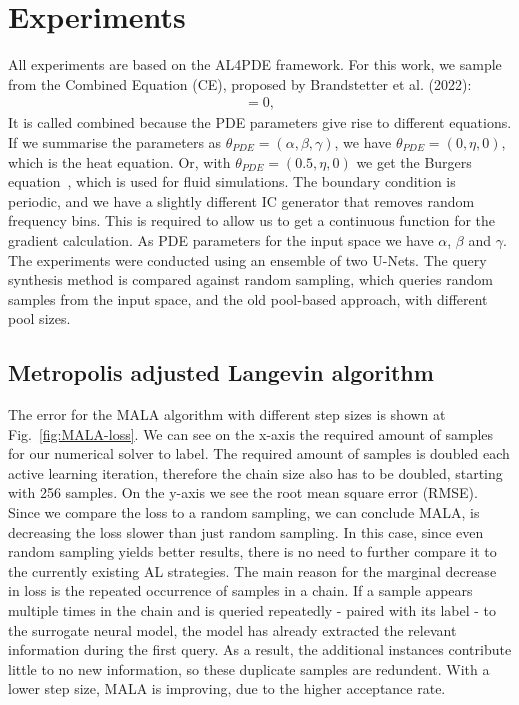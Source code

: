 \chapter{Experiments}
All experiments are based on the AL4PDE framework.
For this work, we sample from the Combined Equation (CE), proposed by Brandstetter et al. (2022):
\begin{align}
    [\partial_t u+\partial_x (\alpha u^2-\beta\partial_x u+\gamma\partial_{xx}u)]=0,
\end{align}
It is called combined because the PDE parameters give rise to different equations. 
If we summarise the parameters as $\theta_{PDE}=(\alpha,\beta,\gamma)$, we have $\theta_{PDE}=(0,\eta,0)$, which is the heat equation.
Or, with $\theta_{PDE}=(0.5,\eta,0)$ we get the Burgers equation~\cite{burgers}, which is used for fluid simulations.
The boundary condition is periodic, and we have a slightly different IC generator that removes random frequency bins. This is required 
to allow us to get a continuous function for the gradient calculation. As PDE parameters for the 
input space we have $\alpha$, $\beta$ and $\gamma$.    
The experiments were conducted using an ensemble of two U-Nets. 
The query synthesis method is compared against random sampling, which queries random samples from the input space, and the old pool-based approach, with different pool sizes. 
\section{Metropolis adjusted Langevin algorithm}
The error for the MALA algorithm with different step sizes is shown at Fig.~\ref{fig:MALA-loss}. 
We can see on the x-axis the required amount of samples 
for our numerical solver to label. The required amount of samples is doubled each active learning iteration, therefore 
the chain size also has to be doubled, starting with 256 samples.
On the y-axis we see the root mean square error (RMSE). 
Since we compare the loss to a random sampling, we can conclude MALA, is decreasing the loss slower than just random sampling. In this case, since even random sampling yields better results, there is no need to further compare it to the currently existing AL strategies.
The main reason for the marginal decrease in loss is the repeated occurrence of samples in a chain. If a sample appears multiple times in the chain and is queried repeatedly - paired with its label - to the surrogate neural model, the model has already extracted the relevant information during the first query. As a result, the additional instances contribute little to no new information, so these duplicate samples are redundent. 
With a lower step size, MALA is improving, due to the higher acceptance rate. 


